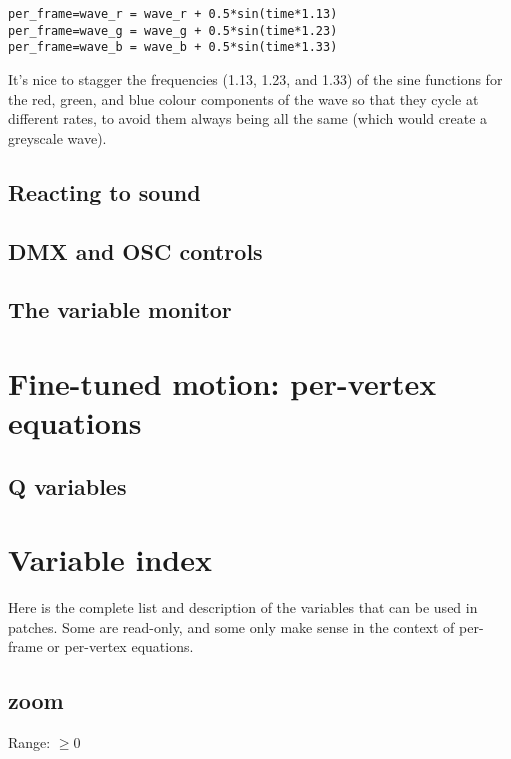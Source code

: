 \documentclass[11pt, a5paper, pagesize]{scrbook}
\begin{document}
\begin{verbatim}
per_frame=wave_r = wave_r + 0.5*sin(time*1.13)
per_frame=wave_g = wave_g + 0.5*sin(time*1.23)
per_frame=wave_b = wave_b + 0.5*sin(time*1.33)
\end{verbatim}

It's nice to stagger the frequencies (1.13, 1.23, and 1.33) of the sine functions for the red, green, and blue colour components of the wave so that they cycle at different rates, to avoid them always being all the same (which would create a greyscale wave).

\subsection{Reacting to sound}

\subsection{DMX and OSC controls}

\subsection{The variable monitor}

\section{Fine-tuned motion: per-vertex equations}

\subsection{Q variables}


\section{Variable index}
Here is the complete list and description of the variables that can be used in patches. Some are read-only, and some only make sense in the context of per-frame or per-vertex equations.


\subsection{zoom}
Range: $\geq 0$
\end{document}
